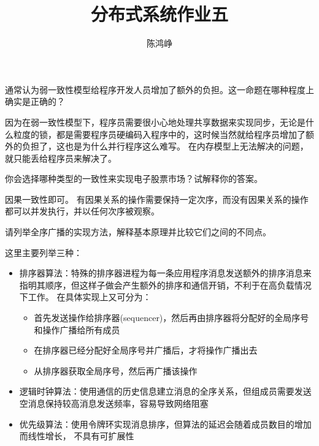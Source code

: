 \documentclass[logo,reportComp]{thesis}
\title{分布式系统作业五}
\subtitle{}
\author{陈鸿峥}
\begin{document}
\maketitle

\begin{question}
通常认为弱一致性模型给程序开发人员增加了额外的负担。这一命题在哪种程度上确实是正确的？
\end{question}
\begin{answer}
因为在弱一致性模型下，程序员需要很小心地处理共享数据来实现同步，无论是什么粒度的锁，都是需要程序员硬编码入程序中的，这时候当然就给程序员增加了额外的负担了，这也是为什么并行程序这么难写。
在内存模型上无法解决的问题，就只能丢给程序员来解决了。
\end{answer}

\begin{question}
你会选择哪种类型的一致性来实现电子股票市场？试解释你的答案。
\end{question}
\begin{answer}
因果一致性即可。
有因果关系的操作需要保持一定次序，而没有因果关系的操作都可以并发执行，并以任何次序被观察。
\end{answer}

\begin{question}
请列举全序广播的实现方法，解释基本原理并比较它们之间的不同点。
\end{question}
\begin{answer}
这里主要列举三种\cite{bib:globally_ordered}：
\begin{itemize}
	\item 排序器算法：特殊的排序器进程为每一条应用程序消息发送额外的排序消息来指明其顺序，但这样子做会产生额外的排序和通信开销，不利于在高负载情况下工作。
	在具体实现上又可分为：
	\begin{itemize}
		\item 首先发送操作给排序器(sequencer)，然后再由排序器将分配好的全局序号和操作广播给所有成员
		\item 在排序器已经分配好全局序号并广播后，才将操作广播出去
		\item 从排序器获取全局序号，然后再广播该操作
	\end{itemize}
	\item 逻辑时钟算法：使用通信的历史信息建立消息的全序关系，但组成员需要发送空消息保持较高消息发送频率，容易导致网络阻塞
	\item 优先级算法：使用令牌环实现消息排序，但算法的延迟会随着成员数目的增加而线性增长， 不具有可扩展性
\end{itemize}
\end{answer}
\end{document}
